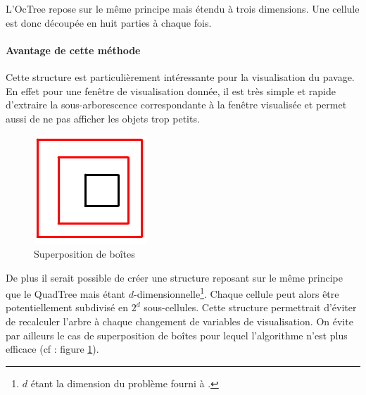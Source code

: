 L'OcTree repose sur le même principe mais étendu à trois dimensions. Une cellule est donc découpée en huit parties à chaque fois.

\paragraph{Avantage de cette méthode}Cette structure est particulièrement intéressante pour la visualisation du pavage. En effet pour une fenêtre de visualisation donnée, il est très simple et rapide d'extraire la sous-arborescence correspondante à la fenêtre visualisée et permet aussi de ne pas afficher les objets trop petits. 


\begin{figure}[h!]
\centering
\includegraphics[scale=0.30]{img/QT8}
\caption{Superposition de boîtes}
\label{fig:superpos}
\end{figure}
De plus il serait possible de créer une structure reposant sur le même principe que le QuadTree mais étant $d$-dimensionnelle\footnote{$d$ étant la dimension du problème fourni à \realpaver.}. Chaque cellule peut alors être potentiellement subdivisé en $2^d$ sous-cellules. Cette structure permettrait d'éviter de recalculer l'arbre à chaque changement de variables de visualisation. On évite par ailleurs le cas de superposition de boîtes pour lequel l'algorithme n'est plus efficace (cf : figure \ref{fig:superpos}).


